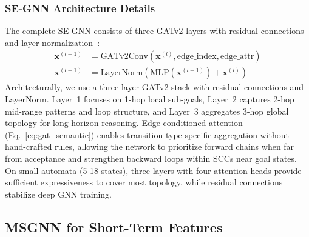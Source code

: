 \documentclass{article}
\begin{document}
\subsubsection{SE-GNN Architecture Details}

The complete SE-GNN consists of three GATv2 layers with residual connections~\citep{He2016} and layer normalization~\citep{Ba2016}:
\begin{align}
\mathbf{x}^{(l+1)} &= \text{GATv2Conv}(\mathbf{x}^{(l)}, \text{edge\_index}, \text{edge\_attr}) \\
\mathbf{x}^{(l+1)} &= \text{LayerNorm}(\text{MLP}(\mathbf{x}^{(l+1)}) + \mathbf{x}^{(l)})
\end{align}
Architecturally, we use a three-layer GATv2 stack with residual connections and LayerNorm. Layer~1 focuses on 1-hop local sub-goals, Layer~2 captures 2-hop mid-range patterns and loop structure, and Layer~3 aggregates 3-hop global topology for long-horizon reasoning. Edge-conditioned attention (Eq.~\ref{eq:gat_semantic}) enables transition-type-specific aggregation without hand-crafted rules, allowing the network to prioritize forward chains when far from acceptance and strengthen backward loops within SCCs near goal states. On small automata (5-18 states), three layers with four attention heads provide sufficient expressiveness to cover most topology, while residual connections stabilize deep GNN training.

\subsection{MSGNN for Short-Term Features}
\end{document}
